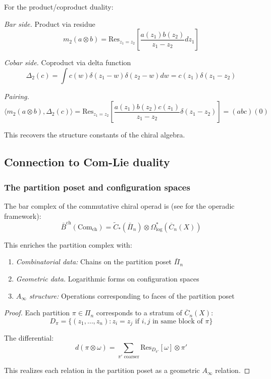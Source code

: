 \begin{example}
For the product/coproduct duality:

\emph{Bar side.} Product via residue
\[m_2(a \otimes b) = \text{Res}_{z_1=z_2}\left[\frac{a(z_1)b(z_2)}{z_1-z_2}dz_1\right]\]

\emph{Cobar side.} Coproduct via delta function
\[\Delta_2(c) = \int c(w) \delta(z_1-w)\delta(z_2-w) dw = c(z_1)\delta(z_1-z_2)\]

\emph{Pairing.}
\[\langle m_2(a \otimes b), \Delta_2(c) \rangle = \text{Res}_{z_1=z_2}\left[\frac{a(z_1)b(z_2)c(z_1)}{z_1-z_2}\delta(z_1-z_2)\right] = (abc)(0)\]

This recovers the structure constants of the chiral algebra.
\end{example}


\subsection{Connection to Com-Lie duality}

\subsubsection{The partition poset and configuration spaces}

\begin{theorem}\label{thm:geometric-com-lie-enhancement}
The bar complex of the commutative chiral operad is
(see \cite[Chapter~7]{LV12} for the operadic framework):
\[\bar{B}^{\text{ch}}(\text{Com}_{\text{ch}}) = \tilde{C}_*(\bar{\Pi}_n) \otimes \Omega^*_{\text{log}}(\overline{C}_n(X))\]

This enriches the partition complex with:
\begin{enumerate}
\item \emph{Combinatorial data:} Chains on the partition poset $\bar{\Pi}_n$
\item \emph{Geometric data.} Logarithmic forms on configuration spaces
\item \emph{$A_\infty$ structure:} Operations corresponding to faces of the partition poset
\end{enumerate}
\end{theorem}

\begin{proof}
Each partition $\pi \in \Pi_n$ corresponds to a stratum of $\overline{C}_n(X)$:
\[D_\pi = \{(z_1, \ldots, z_n) : z_i = z_j \text{ if } i,j \text{ in same block of } \pi\}\]

The differential:
\[d(\pi \otimes \omega) = \sum_{\pi' \text{ coarser}} \text{Res}_{D_{\pi'}}[\omega] \otimes \pi'\]

This realizes each relation in the partition poset as a geometric $A_\infty$ relation.
\end{proof}

